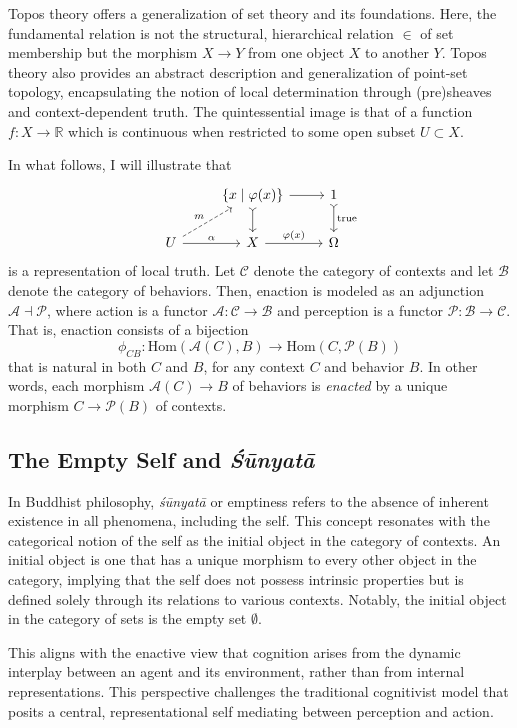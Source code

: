 \documentclass{article}
\begin{document}
Topos theory offers a generalization of set theory and its foundations. Here, the fundamental relation is not the structural, hierarchical relation $\in$ of set membership but the morphism $X \to Y$ from one object $X$ to another $Y$. Topos theory also provides an abstract description and generalization of point-set topology, encapsulating the notion of local determination through (pre)sheaves and context-dependent truth. The quintessential image is that of a function $f \colon X \to \mathbb{R}$ which is continuous when restricted to some open subset $U \subset X$.

In what follows, I will illustrate that  
\[
\begin{tikzcd}
& \{ x \mid \varphi(x) \}  \arrow[r] \arrow[d, tail] & 1 \arrow[d, tail, "\text{true}"] \\
U \arrow[r, "\alpha"] \arrow[ru, dashed, "m"] & X \arrow[r, "\varphi(x)"] & \Omega
\end{tikzcd}
\]
is a representation of local truth. Let $\mathcal{C}$ denote the category of contexts and let $\mathcal{B}$ denote the category of behaviors. Then, enaction is modeled as an adjunction $\mathcal{A} \dashv \mathcal{P}$, where action is a functor $\mathcal{A} \colon \mathcal{C} \to \mathcal{B}$ and perception is a functor $\mathcal{P} \colon \mathcal{B} \to \mathcal{C}$. That is, enaction consists of a bijection 
\[
\phi_{CB} \colon \text{Hom} ( \mathcal{A}(C), B ) \to \text{Hom}(C, \mathcal{P}(B))
\]
that is natural in both $C$ and $B$, for any context $C$ and behavior $B$. In other words, each morphism $\mathcal{A}(C) \to B$ of behaviors is \emph{enacted} by a unique morphism $C \to \mathcal{P}(B)$ of contexts.

\subsection{The Empty Self and \emph{Śūnyatā}} \label{sec:self}

In Buddhist philosophy, \emph{śūnyatā} or emptiness refers to the absence of inherent existence in all phenomena, including the self. This concept resonates with the categorical notion of the self as the initial object in the category of contexts. An initial object is one that has a unique morphism to every other object in the category, implying that the self does not possess intrinsic properties but is defined solely through its relations to various contexts. Notably, the initial object in the category of sets is the empty set $\emptyset$.

This aligns with the enactive view that cognition arises from the dynamic interplay between an agent and its environment, rather than from internal representations. This perspective challenges the traditional cognitivist model that posits a central, representational self mediating between perception and action.
\end{document}
